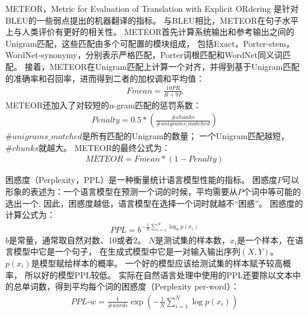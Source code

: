 METEOR，Metric for Evaluation of Translation with Explicit ORdering
是针对BLEU的一些弱点提出的机器翻译的指标。
与BLEU相比，METEOR在句子水平上与人类评价有更好的相关性。
METEOR首先计算系统输出和参考输出之间的Unigram匹配，这些匹配由多个可配置的模块组成，
包括Exact，Porter-stem，WordNet-synonymy，分别表示严格匹配，Porter词根匹配和WordNet同义词匹配。
接着，METEOR在Unigram匹配上计算一个对齐，并得到基于Unigram匹配的准确率和召回率，进而得到二者的加权调和平均值：
\begin{align}
    \textit{Fmean} = \frac{10PR}{R + 9P}
\end{align}
METEOR还加入了对较短的n-gram匹配的惩罚系数：
\begin{align}
    \textit{Penalty} = 0.5 * \left( \frac{\#chunks}{\#unigrams\_matched} \right)
\end{align}
$\#unigrams\_matched$是所有匹配的Unigram的数量；
一个Unigram匹配越短，$\#chunks$就越大。
METEOR的最终公式为：
\begin{align}
    \textit{METEOR} = \textit{Fmean} * (1 - \textit{Penalty})
\end{align}

困惑度（Perplexity，PPL）是一种衡量统计语言模型性能的指标。
困惑度$P$可以形象的表述为：一个语言模型在预测一个词的时候，平均需要从$P$个词中等可能的选出一个,
因此，困惑度越低，语言模型在选择一个词时就越不“困惑”。
困惑度的计算公式为：
\begin{align}
    \textit{PPL} = b^{-\frac{1}{N} \sum_{i=1}^N \log_b p(x_i)}
\end{align}
$b$是常量，通常取自然对数、10或者2。
$N$是测试集的样本数，$x_i$是一个样本，在语言模型中它是一个句子，
在生成式模型中它是一对输入输出序列$(X, Y)$。
$p(x_i)$是模型赋给样本的概率。
一个好的模型应该给测试集的样本赋予较高概率，
所以好的模型PPL较低。
实际在自然语言处理中使用的PPL还要除以文本中的总单词数，得到平均每个词的困惑度（Perplexity per-word）：
\begin{align}
    \textit{PPL-w} = \frac{1}{\#\textit{words}} \exp(-\frac{1}{N} \sum_{i=1}^N \log p(x_i))
\end{align}


